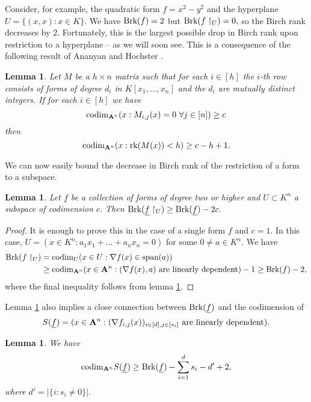 \documentclass[12pt]{amsart}
\let\ul\underline
\newtheorem{lemma}[theorem]{Lemma}
\theoremstyle{definition}
\newcommand{\A}{\mathbf{A}}
\renewcommand{\sp}{\textnormal{span}}
\newcommand{\codim}{\textnormal{codim}}
\newcommand{\rk}{\textnormal{rk}}
\newcommand{\brk}{\textnormal{Brk}}
\let\ul\underline
\begin{document}
Consider, for example, the quadratic form $f = x^2-y^2$ and the hyperplane $U  = \{(x,x):x\in K\}.$ We have $\brk(f) = 2$ but $\brk(f\restriction_U) = 0,$ so the Birch rank decreases by $2.$ Fortunately, this is the largest possible drop in Birch rank upon restriction to a hyperplane -- as we will soon see. This is a consequence of the following result of Ananyan and Hochster \cite[Theorem 2.4]{AH}.

\begin{lemma}\label{lem:mat-diff-deg}
    Let $M$ be a $h\times n$ matrix such that for each $i\in [h]$ the $i$-th row consists of forms of degree $d_i$ in $K[x_1,\ldots,x_n]$ and the $d_i$ are mutually distinct integers. If for each $i\in[h]$ we have
    \[
    \codim_{\A^n} (x:M_{i,j}(x) = 0\ \forall j\in [n]) \ge c
    \]
    then
    \[
    \codim_{\A^n} (x:\rk(M(x)) < h) \ge c-h+1.
    \] 
\end{lemma}

We can now easily bound the decrease in Birch rank of the restriction of a form to a subspace.

\begin{lemma}\label{lem:brk-subspace}
    Let $\ul{f}$ be a collection of forms of degree two or higher and $U\subset K^n$ a subspace of codimension $c.$
    Then $\brk(\ul{f}\restriction_U) \ge \brk(\ul{f}) -2c.$
\end{lemma}

\begin{proof}
    It is enough to prove this in the case of a single form $f$ and $c=1.$  In this case, $U = (x\in K^n: a_1x_1+\ldots+a_n x_n = 0)$ for some $0\neq a\in K^n.$ We have
    \begin{align*}
        \brk(f\restriction_U) &= \codim_U (x\in U: \nabla f(x)\in \sp(a)) \\
        &\ge \codim_{\A^n} (x\in \A^n: (\nabla f(x),a) \textnormal{ are linearly dependent}) - 1 \ge \brk(f) -2,
    \end{align*}
    where the final inequality follows from lemma \ref{lem:mat-diff-deg}.
\end{proof}

Lemma \ref{lem:mat-diff-deg} also implies a close connection between $\brk(\ul{f})$ and the codimension of 
$$S(\ul{f}) = (x\in \A^n: (\nabla f_{i,j}(x))_{i\in [d],j\in [s_i]} \textnormal{ are linearly dependent}).$$


\begin{lemma}\label{lem:brk-sing}
    We have 
    $$\codim_{\A^n} S(\ul{f}) \ge \brk(\ul{f}) -\sum_{i=1}^d s_i-d'+2,$$
    where $d' = |\{i:s_i\neq 0\}|.$
\end{lemma}
\end{document}
